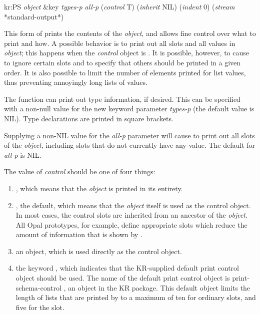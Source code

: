 \value{f-top}
\begin{example}
kr:PS {\it object} \&key {\it types-p  all-p} ({\it control} T) ({\it inherit} NIL) \value{function}
                ({\it indent} 0) ({\it stream} *standard-output*)
\end{example}

This form of  prints the contents of the {\it object}, and allows fine
control over what to print and how.  A possible behavior is to print out
all slots and all values in {\it object}; this happens when the {\it control}
object is \value{nil}.  It is possible, however, to cause  to ignore
certain slots and to specify that others should be printed in a given
order.  It is also possible to limit the number of elements printed for list
values, thus preventing annoyingly long lists of values.

The function  can print out type information, if desired.  This
can be specified with a non-null value for the new keyword parameter
{\it types-p} (the default value is NIL).  Type declarations are printed in
square brackets.

Supplying a non-NIL value for the {\it all-p} parameter will cause 
to print out all slots of the {\it object}, including slots that do not currently
have any value.  The default for {\it all-p} is NIL.

The value of {\it control} should be one of four
things:
\begin{enumerate}
\item \value{NIL}, which means that the {\it object} is printed in its entirety.

\item \value{t}, the default, which means that the {\it object} itself is used as
the control object.  In most cases, the control slots are inherited from an
ancestor of the {\it object}.  All Opal prototypes, for example, define
appropriate slots which reduce the amount of information that is shown by
.

\item an object, which is used directly as the control object.

\item the keyword , which indicates that the KR-supplied default
print control object should be used.  The name of the default print control
object is {\sc print-schema-control} , an object
in the KR package.  This default object limits the length of lists that
are printed by  to a maximum of ten for ordinary slots, and five for
the  slot.
\end{enumerate}

